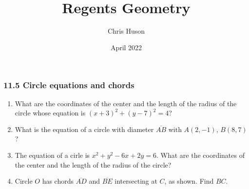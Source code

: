 \documentclass[12pt, oneside]{article}
\title{Regents Geometry}
\author{Chris Huson}
\date{April 2022}
\begin{document}
\subsubsection*{11.5 Circle equations and chords}
\begin{enumerate}[itemsep=2cm]
\item What are the coordinates of the center and the length of the radius of the circle whose equation is $(x+3)^2+(y-7)^2=4$?
  
\item What is the equation of a circle with diameter $\overline{AB}$ with $A(2,-1)$, $B(8,7)$?
    \begin{flushright}
    \end{flushright}

\item %
The equation of a cirle is $x^2+y^2-6x+2y=6$. What are the coordinates of the center and the length of the radius of the circle? \vspace{2cm}
    

\item Circle $O$ has chords $\overline{AD}$ and $\overline{BE}$ intersecting at $C$, as shown. Find $BC$.\\



\end{enumerate}
\end{document}
